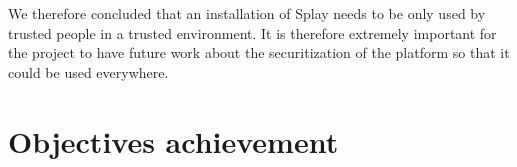 \documentclass{eplmastersthesis}
\begin{document}
        We therefore concluded that an installation of Splay needs to be only
        used by trusted people in a trusted environment. It is therefore
        extremely important for the project to have future work about the
        securitization of the platform so that it could be used everywhere.

    \section{Objectives achievement} %

  \nocite{*}
  
  

  \backcoverpage
\end{document}
